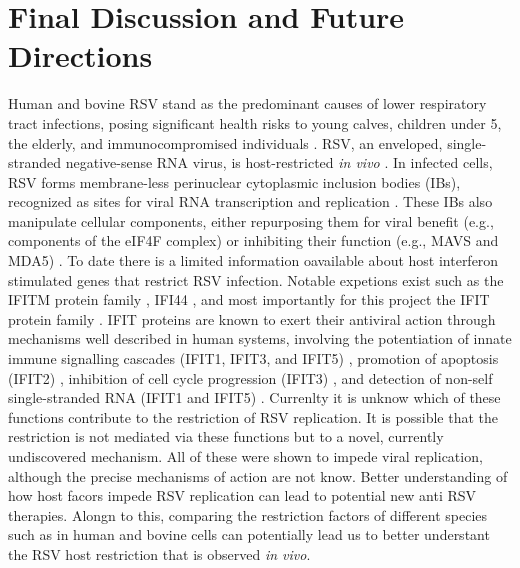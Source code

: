\chapter{Final Discussion and Future Directions}
Human and bovine RSV stand as the predominant causes of lower respiratory tract infections, posing significant health risks to young calves, children under 5, the elderly, and immunocompromised individuals \cite{Falsey2005RespiratoryAdults, Coultas2019RespiratoryAge}. RSV, an enveloped, single-stranded negative-sense RNA virus, is host-restricted \textit{in vivo} \cite{Buchholz2000ChimericVaccine}. In infected cells, RSV forms membrane-less perinuclear cytoplasmic inclusion bodies (IBs), recognized as sites for viral RNA transcription and replication \cite{Rincheval2017FunctionalVirus, Jobe2020RespiratorySignaling, Jobe2023ViralCondensates}. These IBs also manipulate cellular components, either repurposing them for viral benefit (e.g., components of the eIF4F complex) \cite{Jobe2023ViralCondensates} or inhibiting their function (e.g., MAVS and MDA5) \cite{Lifland2012HumanMAVS}. To date there is a limited information oavailable about host interferon stimulated genes that restrict RSV infection. Notable expetions exist such as the IFITM protein family \cite{Smith2019Interferon-InducedMembrane}, IFI44 \cite{McDonald2016ADisease, Li2021IdentificationVirus}, and most importantly for this project the IFIT protein family \cite{Drori2020InfluenzaProteins}. IFIT proteins are known to exert their antiviral action through mechanisms well described in human systems, involving the potentiation of innate immune signalling cascades (IFIT1, IFIT3, and IFIT5) \cite{Li2009ISG56Response, Reynaud2015IFIT1Interferon, Liu2011IFN-InducedTBK1, Zhang2013IFIT5Pathways}, promotion of apoptosis (IFIT2) \cite{Chen2017InhibitionApoptosis, Diamond2013TheProteins}, inhibition of cell cycle progression (IFIT3) \cite{Xiao2006RIG-GProteins}, and detection of non-self single-stranded RNA (IFIT1 and IFIT5) \cite{Abbas2013StructuralProteins, Pichlmair2011IFIT1RNA, Diamond2014IFIT1:Translation, Mears2018BetterResponse}. Currenlty it is unknow which of these functions contribute to the restriction of RSV replication. It is possible that the restriction is not mediated via these functions but to a novel, currently undiscovered mechanism. All of these were shown to impede viral replication, although the precise mechanisms of action are not know. Better understanding of how host facors impede RSV replication can lead to potential new anti RSV therapies. Alongn to this, comparing the restriction factors of different species such as in human and bovine cells can potentially lead us to better understant the RSV host restriction that is observed \textit{in vivo}. 

